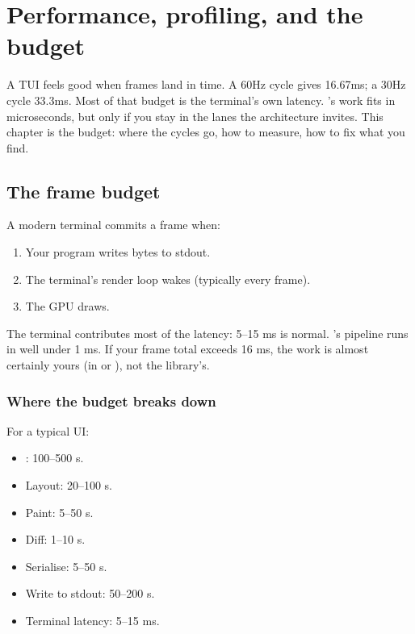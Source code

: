 \chapter{Performance, profiling, and the budget}
\label{ch:perf}

\begin{aside}
A TUI feels good when frames land in time. A 60Hz cycle gives
16.67ms; a 30Hz cycle 33.3ms. Most of that budget is the
terminal's own latency. \maya{}'s work fits in microseconds, but
only if you stay in the lanes the architecture invites. This
chapter is the budget: where the cycles go, how to measure,
how to fix what you find.
\end{aside}

\section{The frame budget}

A modern terminal commits a frame when:

\begin{enumerate}[leftmargin=*]
  \item Your program writes bytes to stdout.
  \item The terminal's render loop wakes (typically every
    frame).
  \item The GPU draws.
\end{enumerate}

The terminal contributes most of the latency: 5--15 ms is
normal. \maya{}'s pipeline runs in well under 1 ms. If your
frame total exceeds 16 ms, the work is almost certainly yours
(in  or ), not the library's.

\subsection*{Where the budget breaks down}

For a typical UI:

\begin{itemize}[leftmargin=*]
  \item {}: 100--500 \textmu s.
  \item Layout: 20--100 \textmu s.
  \item Paint: 5--50 \textmu s.
  \item Diff: 1--10 \textmu s.
  \item Serialise: 5--50 \textmu s.
  \item Write to stdout: 50--200 \textmu s.
  \item Terminal latency: 5--15 ms.
\end{itemize}

